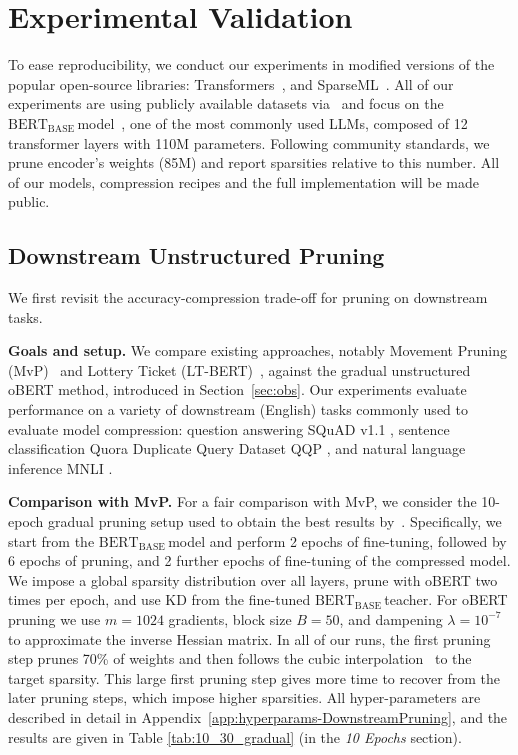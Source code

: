 \documentclass[11pt]{article}
\newcommand{\bert}{$\textrm{BERT}_{\textrm{BASE}}\,$}
\begin{document}
\section{Experimental Validation}
\label{sec:experiments}
To ease reproducibility, we conduct our experiments in modified versions of the popular open-source libraries: Transformers~\cite{wolf-etal-2020-transformers}, and SparseML~\cite{pmlr-v119-kurtz20a}. All of our experiments are using publicly available datasets via~\citet{hf-datasets} and focus on the \bert model~\cite{Devlin2019BERTPO}, one of the most commonly used LLMs, composed of 12 transformer layers with 110M parameters. Following community standards, we prune encoder's weights (85M) and report sparsities relative to this number. All of our models, compression recipes and the full implementation will be made public.

\subsection{Downstream Unstructured Pruning}
\label{sec:downstream}

We first revisit the accuracy-compression trade-off for pruning on downstream tasks. 

\noindent\textbf{Goals and setup.} 
We compare existing approaches, notably Movement Pruning (MvP)~\cite{Sanh2020MovementPA} and Lottery Ticket (LT-BERT)~\cite{Chen2020TheLT}, against the gradual unstructured oBERT method, introduced in Section~\ref{sec:obs}. Our experiments evaluate performance on a variety of downstream (English) tasks commonly used to evaluate model compression: question answering SQuAD v1.1 \cite{Rajpurkar2016SQuAD1Q}, sentence classification Quora Duplicate Query Dataset QQP \cite{shankar2017first}, and natural language inference MNLI \cite{N18-1101}.

\noindent\textbf{Comparison with MvP.} For a fair comparison with MvP, we consider the 10-epoch gradual pruning setup used to obtain the best results by~\citet{Sanh2020MovementPA}. Specifically, we start from the \bert model and perform 2 epochs of fine-tuning, followed by 6 epochs of pruning, and 2 further epochs of fine-tuning of the compressed model. We impose a global sparsity distribution over all layers, prune with oBERT two times per epoch, and use KD from the fine-tuned \bert teacher. For oBERT pruning we use $m=1024$ gradients, block size $B=50$, and dampening $\lambda = 10^{-7}$ to approximate the inverse Hessian matrix. In all of our runs, the first pruning step prunes 70\% of weights and then follows the cubic interpolation~\cite{Zhu2018ToPO} to the target sparsity. This large first pruning step gives more time to recover from the later pruning steps, which impose higher sparsities. All  hyper-parameters are described in detail in Appendix~\ref{app:hyperparams-DownstreamPruning}, and the results are given in Table \ref{tab:10_30_gradual} (in the \textit{10 Epochs} section). 
\end{document}
